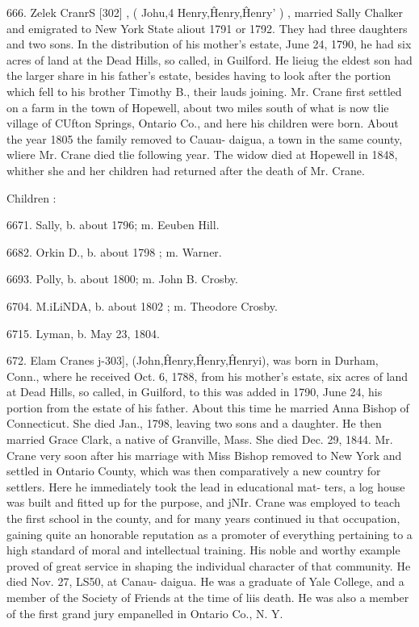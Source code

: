 \documentclass{book}
\begin{document}
666. Zelek CranrS [302] , ( Johu,4 Henry,\^ Henry,\^ Henry' ) , 
married Sally Chalker and emigrated to New York State aliout 
1791 or 1792. They had three daughters and two sons. In the 
distribution of his mother's estate, June 24, 1790, he had six 
acres of land at the Dead Hills, so called, in Guilford. He lieiug 
the eldest son had the larger share in his father's estate, besides 
having to look after the portion which fell to his brother Timothy 
B., their lauds joining. Mr. Crane first settled on a farm in the 
town of Hopewell, about two miles south of what is now tlie 
village of CUfton Springs, Ontario Co., and here his children 
were born. About the year 1805 the family removed to Cauau- 
daigua, a town in the same county, wliere Mr. Crane died tlie 
following year. The widow died at Hopewell in 1848, whither 
she and her children had returned after the death of Mr. Crane. 

Children : 

6671. Sally, b. about 1796; m. Eeuben Hill. 

6682. Orkin D., b. about 1798 ; m. Warner. 

6693. Polly, b. about 1800; m. John B. Crosby. 

6704. M.iLiNDA, b. about 1802 ; m. Theodore Crosby. 

6715. Lyman, b. May 23, 1804. 

672. Elam Cranes j-303], (John,\^ Henry,\^ Henry,\^ Henryi), 
was born in Durham, Conn., where he received Oct. 6, 1788, from 
his mother's estate, six acres of land at Dead Hills, so called, in 
Guilford, to this was added in 1790, June 24, his portion from 
the estate of his father. About this time he married Anna Bishop 
of Connecticut. She died Jan., 1798, leaving two sons and a 
daughter. He then married Grace Clark, a native of Granville, 
Mass. She died Dec. 29, 1844. Mr. Crane very soon after his 
marriage with Miss Bishop removed to New York and settled in 
Ontario County, which was then comparatively a new country for 
settlers. Here he immediately took the lead in educational mat- 
ters, a log house was built and fitted up for the purpose, and jNIr. 
Crane was employed to teach the first school in the county, and 
for many years continued iu that occupation, gaining quite an 
honorable reputation as a promoter of everything pertaining to a 
high standard of moral and intellectual training. His noble and 
worthy example proved of great service in shaping the individual 
character of that community. He died Nov. 27, LS50, at Canau- 
daigua. He was a graduate of Yale College, and a member of 
the Society of Friends at the time of liis death. He was also a 
member of the first grand jury empanelled in Ontario Co., N. Y. 
\end{document}
